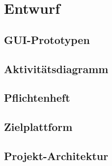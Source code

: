 \section{Entwurf}

\subsection{GUI-Prototypen}

\subsection{Aktivitätsdiagramm}

\subsection{Pflichtenheft}

\subsection{Zielplattform}

\subsection{Projekt-Architektur}